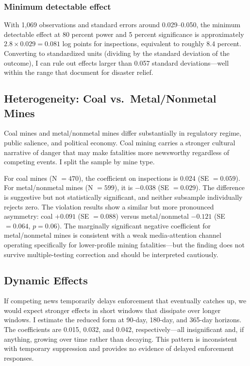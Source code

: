 \documentclass[12pt]{article}
\begin{document}


\subsubsection*{Minimum detectable effect} With 1,069 observations and standard errors around 0.029--0.050, the minimum detectable effect at 80 percent power and 5 percent significance is approximately $2.8 \times 0.029 = 0.081$ log points for inspections, equivalent to roughly 8.4 percent. Converting to standardized units (dividing by the standard deviation of the outcome), I can rule out effects larger than 0.057 standard deviations---well within the range that \citet{eisensee2007news} document for disaster relief.

\subsection{Heterogeneity: Coal vs.\ Metal/Nonmetal Mines}

Coal mines and metal/nonmetal mines differ substantially in regulatory regime, public salience, and political economy. Coal mining carries a stronger cultural narrative of danger that may make fatalities more newsworthy regardless of competing events. I split the sample by mine type.

For coal mines (N $= 470$), the coefficient on inspections is 0.024 (SE $= 0.059$). For metal/nonmetal mines (N $= 599$), it is $-0.038$ (SE $= 0.029$). The difference is suggestive but not statistically significant, and neither subsample individually rejects zero. The violation results show a similar but more pronounced asymmetry: coal $+0.091$ (SE $= 0.088$) versus metal/nonmetal $-0.121$ (SE $= 0.064$, $p = 0.06$). The marginally significant negative coefficient for metal/nonmetal mines is consistent with a weak media-attention channel operating specifically for lower-profile mining fatalities---but the finding does not survive multiple-testing correction and should be interpreted cautiously.

\subsection{Dynamic Effects}

If competing news temporarily delays enforcement that eventually catches up, we would expect stronger effects in short windows that dissipate over longer windows. I estimate the reduced form at 90-day, 180-day, and 365-day horizons. The coefficients are 0.015, 0.032, and 0.042, respectively---all insignificant and, if anything, growing over time rather than decaying. This pattern is inconsistent with temporary suppression and provides no evidence of delayed enforcement responses.
\end{document}
